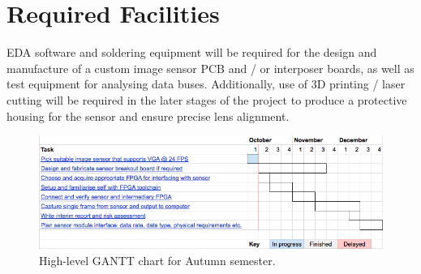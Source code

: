 \documentclass[a4paper]{article}
\begin{document}
\section{Required Facilities}

EDA software and soldering equipment will be required for the design and manufacture of a custom image sensor PCB and / or interposer boards, as well as test equipment for analysing data buses. Additionally, use of 3D printing / laser cutting will be required in the later stages of the project to produce a protective housing for the sensor and ensure precise lens alignment.

\begin{figure}
\centering
\includegraphics[width=1\textwidth]{gantt_chart.png}
\caption{\label{fig:gantt_chart}High-level GANTT chart for Autumn semester.}
\end{figure}
\end{document}
